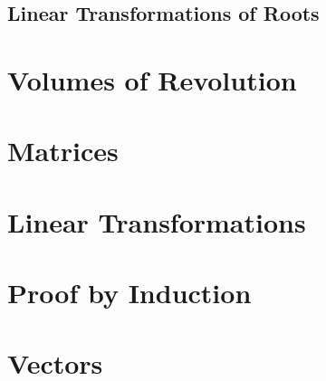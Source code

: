     \subsection{Linear Transformations of Roots}

    \newpage
    
\section{Volumes of Revolution} \label{volumes_of_revolution}


    \newpage

\section{Matrices} \label{matricies}

    \newpage

\section{Linear Transformations} \label{linear_transformations}

    \newpage

\section{Proof by Induction} \label{proof_by_induction}

    \newpage

\section{Vectors} \label{core_vectors}

    \newpage